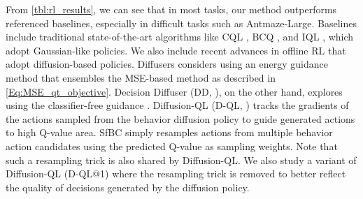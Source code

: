 From \cref{tbl:rl_results}, we can see that in most tasks, our method outperforms referenced baselines, especially in difficult tasks such as Antmaze-Large. Baselines include traditional state-of-the-art algorithms like CQL \citep{cql}, BCQ \citep{bcq}, and IQL \citep{iql}, which adopt Gaussian-like policies. We also include recent advances in offline RL that adopt diffusion-based policies. Diffusers \cite{diffuser} considers using an energy guidance method that ensembles the MSE-based method as described in \eqref{Eq:MSE_qt_objective}. Decision Diffuser (DD, \citet{dd}), on the other hand, explores using the classifier-free guidance \citep{ho2021classifier}. Diffusion-QL (D-QL, \citet{dql}) tracks the gradients of the actions sampled from the behavior diffusion policy to guide generated actions to high Q-value area. SfBC \citep{sfbc} simply resamples actions from multiple behavior action candidates using the predicted Q-value as sampling weights. Note that such a resampling trick is also shared by Diffusion-QL. We also study a variant of Diffusion-QL (D-QL@1) where the resampling trick is removed to better reflect the quality of decisions generated by the diffusion policy.


